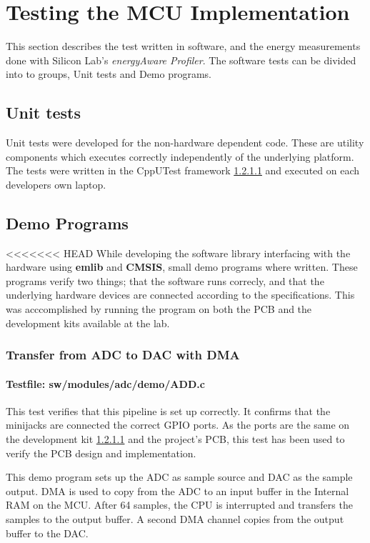 \section{Testing the MCU Implementation}

This section describes the test written in software, and the energy measurements
done with Silicon Lab's \textit{energyAware Profiler}. The software tests can be
divided into to groups, Unit tests and Demo programs.

\subsection{Unit tests}

Unit tests were developed for the non-hardware dependent code. These are
utility components which executes correctly independently of the underlying
platform. The tests were written in the CppUTest framework \ref{} and executed
on each developers own laptop.

\subsection{Demo Programs}

<<<<<<< HEAD
While developing the software library interfacing with the hardware using {\bf
emlib} and {\bf CMSIS}, small demo programs where written. These programs verify
two things; that the software runs correcly, and that the underlying hardware
devices are connected according to the specifications. This was acccomplished by
running the program on both the PCB and the development kits available at the
lab.

\subsubsection{Transfer from ADC to DAC with DMA}
\paragraph{Testfile: sw/modules/adc/demo/ADD.c}

This test verifies that this pipeline is set up correctly. It confirms that the minijacks
are connected the correct GPIO ports. As the ports are the same on the development kit \ref{}
and the project's PCB, this test has been used to verify the PCB design and implementation.

This demo program sets up the ADC as sample source and DAC as the sample output. DMA is
used to copy from the ADC to an input buffer in the Internal RAM on the MCU. After 64 samples,
the CPU is interrupted and transfers the samples to the output buffer. A second DMA channel
copies from the output buffer to the DAC.

